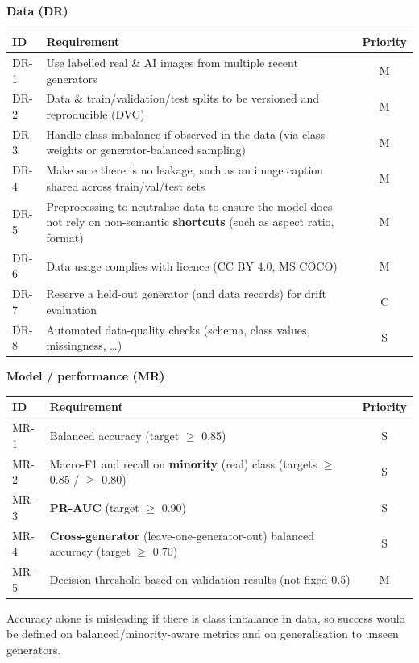 \documentclass[11pt]{article}
\begin{document}
\medskip\noindent\textbf{Data (DR)}\par\smallskip
\noindent\begin{tabularx}{\textwidth}{@{}l Y c@{}}
\toprule
\textbf{ID} & \textbf{Requirement} & \textbf{Priority} \\
\midrule
DR-1 & Use labelled real \& AI images from multiple recent generators & M \\
DR-2 & Data \& train/validation/test splits to be versioned and reproducible (DVC) & M \\
DR-3 & Handle class imbalance if observed in the data (via class weights or generator-balanced sampling) & M \\
DR-4 & Make sure there is no leakage, such as an image caption shared across train/val/test sets & M \\
DR-5 & Preprocessing to neutralise data to ensure the model does not rely on non-semantic \textbf{shortcuts} (such as aspect ratio, format) & M \\
DR-6 & Data usage complies with licence (CC BY 4.0, MS COCO) & M \\
DR-7 & Reserve a held-out generator (and data records) for drift evaluation & C \\
DR-8 & Automated data-quality checks (schema, class values, missingness, \dots) & S \\
\bottomrule


\end{tabularx}

\medskip\noindent\textbf{Model / performance (MR)}\par\smallskip
\noindent\begin{tabularx}{\textwidth}{@{}l Y c@{}}
\toprule
\textbf{ID} & \textbf{Requirement} & \textbf{Priority} \\
\midrule
MR-1 & Balanced accuracy (target $\geq$ 0.85) & S \\
MR-2 & Macro-F1 and recall on \textbf{minority} (real) class (targets $\geq$ 0.85 / $\geq$ 0.80) & S \\
MR-3 & \textbf{PR-AUC} (target $\geq$ 0.90) & S \\
MR-4 & \textbf{Cross-generator} (leave-one-generator-out) balanced accuracy (target $\geq$ 0.70) & S \\
MR-5 & Decision threshold based on validation results (not fixed 0.5) & M \\
\bottomrule
\end{tabularx}

\smallskip
\noindent Accuracy alone is misleading if there is class imbalance in data, so success would be defined on balanced/minority-aware metrics and on generalisation to unseen generators.
\end{document}
